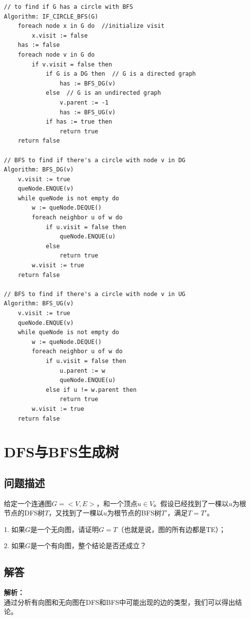 \documentclass{article}
\begin{document}
\begin{lstlisting}[style=algorithm]
// to find if G has a circle with BFS
Algorithm: IF_CIRCLE_BFS(G)
    foreach node x in G do  //initialize visit
        x.visit := false
    has := false
    foreach node v in G do
        if v.visit = false then
            if G is a DG then  // G is a directed graph
                has := BFS_DG(v)
            else  // G is an undirected graph
                v.parent := -1
                has := BFS_UG(v)
            if has := true then
                return true
    return false

// BFS to find if there's a circle with node v in DG
Algorithm: BFS_DG(v)
    v.visit := true
    queNode.ENQUE(v)
    while queNode is not empty do
        w := queNode.DEQUE()
        foreach neighbor u of w do
            if u.visit = false then
                queNode.ENQUE(u)
            else
                return true
        w.visit := true
    return false

// BFS to find if there's a circle with node v in UG
Algorithm: BFS_UG(v)
    v.visit := true
    queNode.ENQUE(v)
    while queNode is not empty do
        w := queNode.DEQUE()
        foreach neighbor u of w do
            if u.visit = false then
                u.parent := w
                queNode.ENQUE(u)
            else if u != w.parent then
                return true
        w.visit := true
    return false
\end{lstlisting}
\section{DFS与BFS生成树}
\subsection{问题描述}

给定一个连通图$G=<V,E>$，和一个顶点$u\in V$。假设已经找到了一棵以$u$为根节点的DFS树$T$，又找到了一棵以$u$为根节点的BFS树$T'$，满足$T=T'$。

1. 如果$G$是一个无向图，请证明$G=T$（也就是说，图的所有边都是TE）；

2. 如果$G$是一个有向图，整个结论是否还成立？

\subsection{解答}

\noindent\textbf{解析：}\\
通过分析有向图和无向图在DFS和BFS中可能出现的边的类型，我们可以得出结论。
\end{document}
